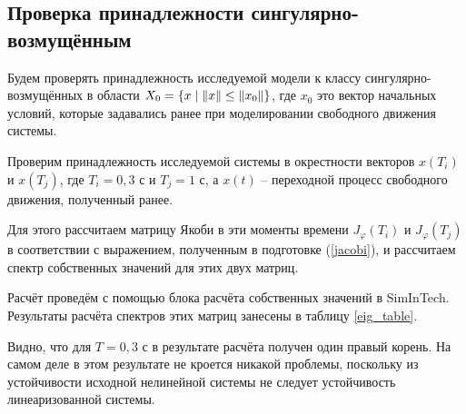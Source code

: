	\subsection{Проверка принадлежности сингулярно-возмущённым}
	
	Будем проверять принадлежность исследуемой модели к классу сингулярно-возмущённых в области $X_0 = \{ x \mid \norm{x}\leq\norm{x_0} \}$, где $x_0$ это вектор начальных условий, которые задавались ранее при моделировании свободного движения системы. 
	
	Проверим принадлежность исследуемой системы в окрестности векторов $x(T_i)$ и $x(T_j)$, где $T_i = 0,3$ с и $T_j = 1$ с, а $x(t)$ -- переходной процесс свободного движения, полученный ранее.
	
	Для этого рассчитаем матрицу Якоби в эти моменты времени $J_\varphi (T_i)$ и $J_\varphi (T_j)$ в соответствии с выражением, полученным в подготовке (\ref{jacobi}), и рассчитаем спектр собственных значений для этих двух матриц. 
	
	Расчёт проведём с помощью блока расчёта собственных значений в SimInTech. Результаты расчёта спектров этих матриц занесены в таблицу \ref{eig_table}.
	
	Видно, что для $T=0,3$ с в результате расчёта получен один правый корень. На самом деле в этом результате не кроется никакой проблемы, поскольку из устойчивости исходной нелинейной системы не следует устойчивость линеаризованной системы.
	
